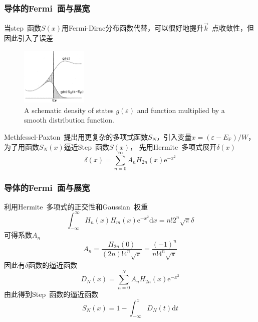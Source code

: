 \frame
{
	\frametitle{导体的\textrm{Fermi}~面与展宽}
	当\textrm{step~}函数$S(x)$用\textrm{Fermi-Dirac}分布函数代替，可以很好地提升$\vec k$~点收敛性，但因此引入了误差
	\begin{figure}[h!]
	\centering
	\vspace*{-0.2in}
	\includegraphics[height=1.1in,width=1.25in,viewport=0 0 530 500,clip]{Figures/MP_distribution.png}
	\caption{\textrm{A schematic density of states $g(\varepsilon)$ and function multiplied by a smooth distribution function.}}%
	\label{MP_distribution}
	\end{figure} 
	\textrm{Methfessel-Paxton~}提出用更复杂的多项式函数$S_N$，引入变量$x=(\varepsilon-E_{\mathrm F})/W$，为了用函数$S_N(x)$逼近\textrm{Step~}函数$S(x)$，%
	先用\textrm{Hermite~}多项式展开$\delta(x)$
	\vspace*{-8pt}
	\begin{displaymath}
		\delta(x)=\sum_{n=0}^{\infty}A_nH_{2n}(x)\mathrm{e}^{-x^2}
	\end{displaymath}
}

\frame
{
	\frametitle{导体的\textrm{Fermi}~面与展宽}
	利用\textrm{Hermite~}多项式的正交性和\textrm{Gaussian~}权重
	\begin{displaymath}
		\int_{-\infty}^{\infty}H_n(x)H_m(x)\mathrm{e}^{-x^2}\mathrm{d}x=n!2^n\sqrt{\pi}\delta
	\end{displaymath}
	可得系数$A_n$
	\begin{displaymath}
		A_n=\frac{H_{2n}(0)}{(2n)!4^n\sqrt{\pi}}=\frac{(-1)^n}{n!4^n\sqrt{\pi}}
	\end{displaymath}
	因此有$\delta$函数的逼近函数
	\begin{displaymath}
		D_N(x)=\sum_{n=0}^NA_nH_{2n}(x)\mathrm{e}^{-x^2}
	\end{displaymath}
	由此得到\textrm{Step}~函数的逼近函数
	\begin{displaymath}
		S_N(x)=1-\int_{-\infty}^xD_N(t)\mathrm{d}t
	\end{displaymath}
}

